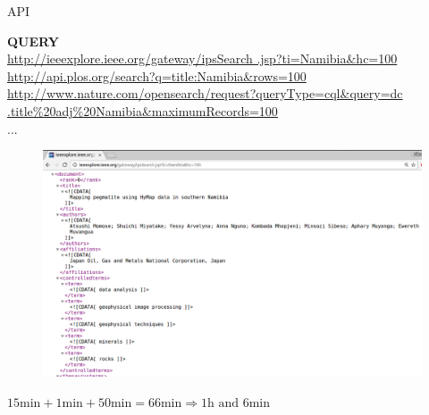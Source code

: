 \documentclass{beamer}
\begin{document}
\begin{frame}
\begin{center}
\Huge{API}
\end{center}
\end{frame}

\begin{frame}[fragile]
    \begin{center}
    \textbf{QUERY} \\
    \vspace{3mm}
    \small{\url{http://ieeexplore.ieee.org/gateway/ipsSearch
    .jsp?ti=Namibia&hc=100}} \\
    \pause
    \vspace{10mm}
    \small{\url{http://api.plos.org/search?q=title:Namibia&rows=100}} \\
    \pause
    \vspace{10mm}
    \small{\url{http://www.nature.com/opensearch/request?queryType=cql&query=dc
    .title%
    \small{...}
    \end{center}
\end{frame}

\begin{frame}
\begin{figure}
     \includegraphics[width=1.05\textwidth]{static/xml.png}
 \end{figure}
\end{frame}

\begin{frame}
\begin{center}
\color{yellow!79}\Large{$15 \textrm{min} + 1 \textrm{min} + 50 \textrm{min} =
66 \textrm{min} \Rightarrow 1\textrm{h} \textrm{ and } 6 \text{min}$}
\end{center}
\end{frame}
\end{document}
